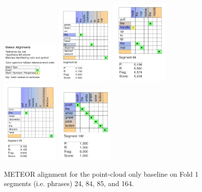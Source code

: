 \documentclass[letterpaper, 12 pt, conference]{ieeeconf}
\begin{document}
\begin{figure}[htb!]
  \centering
  \includegraphics[width=0.25\textwidth]{meteor_alignment_key}
  \includegraphics[width=0.25\textwidth]{baseline_seg_24}
  \includegraphics[width=0.25\textwidth]{baseline_seg_84}
  \includegraphics[width=0.25\textwidth]{baseline_seg_85}
  \includegraphics[width=0.25\textwidth]{baseline_seg_148}
  \caption{METEOR alignment for the point-cloud only baseline on Fold 1 segments (i.e. phrases) 24, 84, 85, and 164.}
  \label{fig:baseline_fold_1}
\end{figure}
\end{document}
